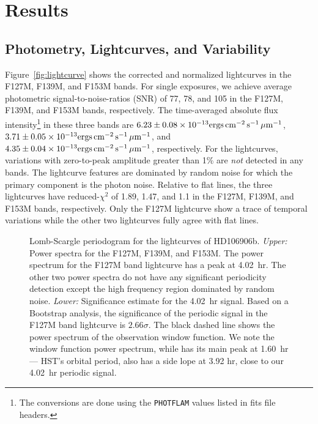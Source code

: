 \documentclass[twocolumn, trackchanges]{aastex62}
\newcommand{\fluxunit}{\ensuremath{\mathrm{ergs}\,\mathrm{cm^{-2}}\,\mathrm{s^{-1}}\,\mathrm{\micron^{{-1}}}}}
\begin{document}
\section{Results}
\subsection{Photometry, Lightcurves, and Variability}

Figure~\ref{fig:lightcurve} shows the corrected and normalized lightcurves in the F127M, F139M, and F153M bands. For single exposures, we achieve average photometric signal-to-noise-ratios (SNR) of  77, 78, and 105 in the F127M, F139M, and F153M bands, respectively. The time-averaged absolute flux intensity\footnote{The conversions are done using the \texttt{PHOTFLAM} values listed in fits file headers.} in these three bands are $6.23\pm0.08\times10^{-13}\fluxunit$, $3.71\pm0.05\times10^{-13}\fluxunit$, and $4.35\pm0.04\times10^{{-13}}\fluxunit$, respectively.
For the lightcurves, variations with zero-to-peak amplitude greater than 1\%  are \emph{not} detected in any bands.
The lightcurve features are dominated by random noise for which the primary component is the photon noise.  Relative to flat lines, the three lightcurves have reduced-$\chi^{2}$ of 1.89, 1.47, and 1.1 in the F127M, F139M, and F153M bands, respectively. Only the F127M lightcurve show a trace of temporal variations while the other two lightcurves fully agree with flat lines.

\begin{figure}[!th]
  \centering
  \caption{Lomb-Scargle periodogram for the lightcurves of HD106906b. \emph{Upper:} Power spectra for the F127M, F139M, and F153M. The power spectrum for the F127M band lightcurve has a peak at 4.02~hr. The other two power spectra do not have any significant periodicity detection except the high frequency region dominated by random noise. \emph{Lower:} Significance estimate for the 4.02~hr signal. Based on a Bootstrap analysis, the significance of the periodic signal in the F127M band lightcurve  is $2.66\sigma$. The black dashed line shows the power spectrum of the observation window function. We note the window function power spectrum, while has its main peak at 1.60~hr --- HST's orbital period, also has a side lope at 3.92 hr, close to our 4.02~hr periodic signal.}
  \label{fig:periodogram}
\end{figure}
\end{document}
